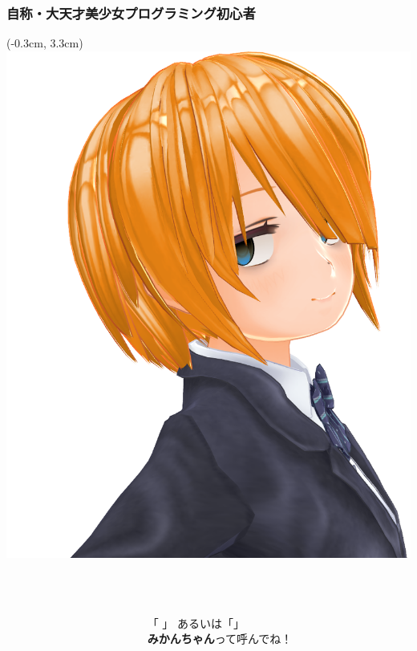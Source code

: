 \documentclass[
  lualatex,
  aspectratio=169,
  fleqn,
  14pt
]{beamer}
\begin{document}
\begin{frame}
  \frametitle{自称・大天才美少女プログラミング初心者}

  \begin{textblock*}{0.5\paperwidth}(-0.3cm, 3.3cm)
    \includegraphics[width=0.35\paperwidth]{./images/mikanchan.png}
  \end{textblock*}
  \begin{columns}
    \begin{column}{0.30\textwidth}
      \\~\\[-.25\baselineskip]
    \end{column}
    \begin{column}{0.69\textwidth}
      \\~\\[-.25\baselineskip]
      「 」
      あるいは「」\\
      \hspace{1.5\zw}\textbf{みかんちゃん}って呼んでね！
      \\~\\[-.5\baselineskip]


\end{column}
\end{columns}
\end{frame}
\end{document}
